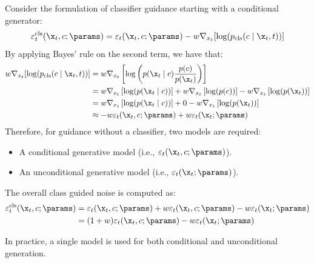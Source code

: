 \begin{description}
        Consider the formulation of classifier guidance starting with a conditional generator: 
        \[
            \begin{split}
                \varepsilon_t^{\text{cls}}(\x_t, c; \params) 
                &= \varepsilon_t(\x_t, c; \params) - w \nabla_{x_t}[ \log(p_\text{cls}(c \mid \x_t, t)) ] \\
            \end{split}
        \]
        By applying Bayes' rule on the second term, we have that:
        \[
            \begin{split}
                w \nabla_{x_t}[ \log(p_\text{cls}(c \mid \x_t, t)) ]
                &= w \nabla_{x_t}\left[ \log\left( p(\x_t \mid c) \frac{p(c)}{p(\x_t)} \right) \right] \\
                &= w \nabla_{x_t}\left[ \log(p(\x_t \mid c)) \right] + w \nabla_{x_t}\left[ \log(p(c)) \right] - w \nabla_{x_t}\left[ \log(p(\x_t)) \right] \\
                &= w \nabla_{x_t}\left[ \log(p(\x_t \mid c)) \right] + 0 - w \nabla_{x_t}\left[ \log(p(\x_t)) \right] \\
                &\approx - w \varepsilon_t(\x_t, c; \params) + w \varepsilon_t(\x_t; \params)
            \end{split}
        \]
        Therefore, for guidance without a classifier, two models are required:
        \begin{itemize}
            \item A conditional generative model (i.e., $\varepsilon_t(\x_t, c; \params)$).
            \item An unconditional generative model (i.e., $\varepsilon_t(\x_t; \params)$).
        \end{itemize}
        The overall class guided noise is computed as:
        \[ 
            \begin{split}
                \varepsilon_t^{\text{cls}}(\x_t, c; \params) 
                &= \varepsilon_t(\x_t, c; \params) + w \varepsilon_t(\x_t, c; \params) - w \varepsilon_t(\x_t; \params) \\
                &= (1 + w) \varepsilon_t(\x_t, c; \params) - w \varepsilon_t(\x_t; \params)
            \end{split}
        \]

        \begin{remark}
            In practice, a single model is used for both conditional and unconditional generation.
        \end{remark}


\end{description}
